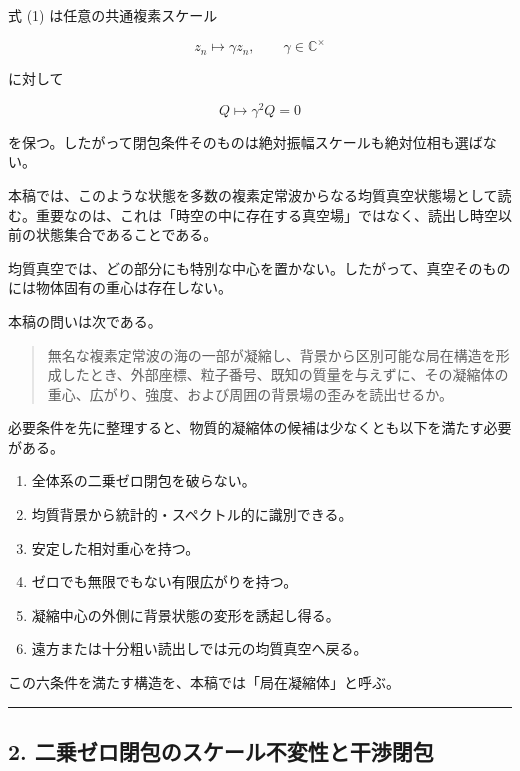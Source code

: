 \documentclass[
  a4paper,
]{ltjsarticle}
\providecommand{\tightlist}{%
  \setlength{\itemsep}{0pt}\setlength{\parskip}{0pt}}
\begin{document}
式 (1) は任意の共通複素スケール

\[
z_n\mapsto \gamma z_n,
\qquad
\gamma\in\mathbb C^\times
\]

に対して

\[
Q\mapsto \gamma^2Q=0
\]

を保つ。したがって閉包条件そのものは絶対振幅スケールも絶対位相も選ばない。

本稿では、このような状態を多数の複素定常波からなる均質真空状態場として読む。重要なのは、これは「時空の中に存在する真空場」ではなく、読出し時空以前の状態集合であることである。

均質真空では、どの部分にも特別な中心を置かない。したがって、真空そのものには物体固有の重心は存在しない。

本稿の問いは次である。

\begin{quote}
無名な複素定常波の海の一部が凝縮し、背景から区別可能な局在構造を形成したとき、外部座標、粒子番号、既知の質量を与えずに、その凝縮体の重心、広がり、強度、および周囲の背景場の歪みを読出せるか。
\end{quote}

必要条件を先に整理すると、物質的凝縮体の候補は少なくとも以下を満たす必要がある。

\begin{enumerate}
\def\labelenumi{\arabic{enumi}.}
\tightlist
\item
  全体系の二乗ゼロ閉包を破らない。
\item
  均質背景から統計的・スペクトル的に識別できる。
\item
  安定した相対重心を持つ。
\item
  ゼロでも無限でもない有限広がりを持つ。
\item
  凝縮中心の外側に背景状態の変形を誘起し得る。
\item
  遠方または十分粗い読出しでは元の均質真空へ戻る。
\end{enumerate}

この六条件を満たす構造を、本稿では「局在凝縮体」と呼ぶ。

\begin{center}\rule{0.5\linewidth}{0.5pt}\end{center}

\subsection{2.
二乗ゼロ閉包のスケール不変性と干渉閉包}\label{ux4e8cux4e57ux30bcux30edux9589ux5305ux306eux30b9ux30b1ux30fcux30ebux4e0dux5909ux6027ux3068ux5e72ux6e09ux9589ux5305}
\end{document}
